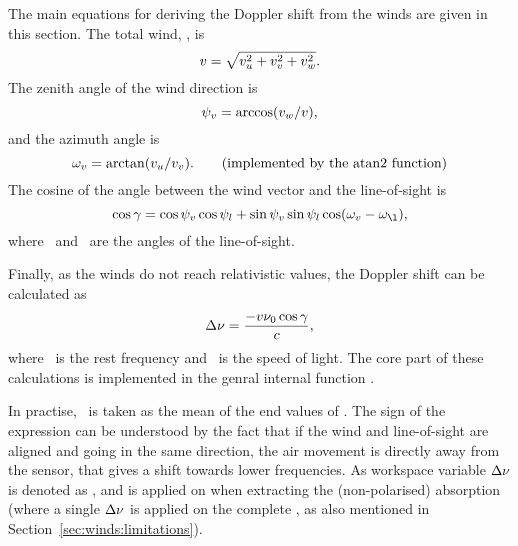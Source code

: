 The main equations for deriving the Doppler shift from the winds are given in
this section. The total wind, \Wind, is
\begin{equation}
  v = \sqrt{v_u^2+v_v^2+v_w^2}.
  \label{eq:winds:total}
\end{equation}
The zenith angle of the wind direction is 
\begin{equation}
  \psi_{v} = \arccos(v_w/v),
  \label{eq:winds:za}
\end{equation}
and the azimuth angle is 
\begin{equation}
  \aAzmAng{\Wind} = \arctan(\WindWE/\WindSN). \qquad 
                           \mathrm{(implemented\ by\ the\ atan2\ function)}
  \label{eq:winds:aa}
\end{equation}
The cosine of the angle between the wind vector and the line-of-sight is
\begin{equation}
  \cos\gamma = \cos\aZntAng{\Wind}\cos\aZntAng{l} + 
               \sin\aZntAng{\Wind}\sin\aZntAng{l}
               \cos(\aAzmAng{\Wind}-\aAzmAng{\l}),
  \label{eq:winds:dang}
\end{equation}
where \ and \ are the angles of the line-of-sight. 

Finally, as the winds do not reach relativistic values, the Doppler shift can
be calculated as
\begin{equation}
  \Delta\nu = \frac{-v\nu_{0}\cos\gamma}{c},
\end{equation}
where \ is the rest frequency and \speedoflight\ is the speed of light.
The core part of these calculations is implemented in the genral internal
function .

In practise, \ is taken as the mean of the end values of
. The sign of the expression can be understood by the fact
that if the wind and line-of-sight are aligned and going in the same direction,
the air movement is directly away from the sensor, that gives a shift towards
lower frequencies. As workspace variable $\Delta\nu$ is denoted as
, and is applied on  when extracting
the (non-polarised) absorption (where a single $\Delta\nu$ is applied on the
complete , as also mentioned in
Section~\ref{sec:winds:limitations}).

